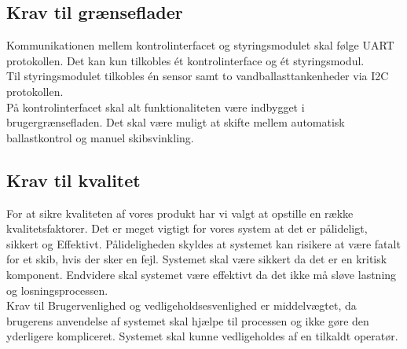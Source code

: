 \subsection{Krav til grænseflader}
Kommunikationen mellem kontrolinterfacet og styringsmodulet skal følge UART protokollen. Det kan kun tilkobles ét kontrolinterface og ét styringsmodul.\\
Til styringsmodulet tilkobles én sensor samt to vandballasttankenheder via I2C protokollen.\\
På kontrolinterfacet skal alt funktionaliteten være indbygget i brugergrænsefladen. Det skal være muligt at skifte mellem automatisk ballastkontrol og manuel skibsvinkling. 

\subsection{Krav til kvalitet}
For at sikre kvaliteten af vores produkt har vi valgt at opstille en række kvalitetsfaktorer. Det er meget vigtigt for vores system at det er pålideligt, sikkert og Effektivt. Pålideligheden skyldes at systemet kan risikere at være fatalt for et skib, hvis der sker en fejl. Systemet skal være sikkert da det er en kritisk komponent. Endvidere skal systemet være effektivt da det ikke må sløve lastning og losningsprocessen.\\
Krav til Brugervenlighed og vedligeholdsesvenlighed er middelvægtet, da brugerens anvendelse af systemet skal hjælpe til processen og ikke gøre den yderligere kompliceret. Systemet skal kunne vedligeholdes af en tilkaldt operatør.\\
